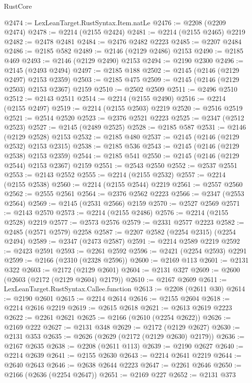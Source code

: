 \begin{lexlean}{RustCore}
\begin{coremodule}
@2474 := LexLeanTarget.RustSyntax.Item.natLe
@2476 := @2208 (@2209 @2474)
@2478 := @2214 (@2155 @2424)
@2481 := @2214 (@2155 @2465) @2219
@2482 := @2478 @2481
@2484 := @2476 @2482 @2223
@2485 := @2207 @2484
@2486 := @2185 @582
@2489 := @2146 (@2129 @2486) @2153
@2490 := @2185 @469
@2493 := @2146 (@2129 @2490) @2153
@2494 := @2190 @2300
@2496 := @2145 (@2493 @2494)
@2497 := @2185 @188
@2502 := @2145 (@2146 (@2129 @2497) @2153 @2359)
@2503 := @2185 @475
@2509 := @2145 (@2146 (@2129 @2503) @2153 @2367) @2159
@2510 := @2502 @2509
@2511 := @2496 @2510
@2512 := @2143 @2511
@2514 := @2214 (@2155 @2490)
@2516 := @2214 (@2155 @2497)
@2519 := @2214 (@2155 @2503) @2219
@2520 := @2516 @2519
@2521 := @2514 @2520
@2523 := @2376 @2521 @2223
@2525 := @2347 (@2512 @2523)
@2527 := @2145 (@2489 @2525)
@2528 := @2185 @587
@2531 := @2146 (@2129 @2528) @2153
@2532 := @2185 @480
@2537 := @2145 (@2146 (@2129 @2532) @2153 @2315)
@2538 := @2185 @536
@2543 := @2145 (@2146 (@2129 @2538) @2153 @2359)
@2544 := @2185 @541
@2550 := @2145 (@2146 (@2129 @2544) @2153 @2367) @2159
@2551 := @2543 @2550
@2552 := @2537 @2551
@2553 := @2143 @2552
@2555 := @2214 (@2155 @2532)
@2557 := @2214 (@2155 @2538)
@2560 := @2214 (@2155 @2544) @2219
@2561 := @2557 @2560
@2562 := @2555 @2561
@2564 := @2376 @2562 @2223
@2566 := @2347 (@2553 @2564)
@2569 := @2145 (@2531 @2566) @2159
@2570 := @2527 @2569
@2571 := @2143 @2570
@2573 := @2214 (@2155 @2486)
@2576 := @2214 (@2155 @2528) @2219
@2577 := @2573 @2576
@2579 := @2331 @2577 @2223
@2582 := @2485 (@2571 @2579) @2258
@2587 := @2207 @2582 (@2254 @2315) (@2254 @2494)
@2589 := @2347 (@2473 @2587)
@2591 := @2214 @2589 @2219
@2592 := @2423 @2591
@2593 := @2261 @2592
@2596 := @2421 (@2254 @2593) @2291
@2599 := @2166 (@2310 (@2328 @2596))
@2600 := @2169 @113
@2601 := @2131 @322
@2603 := @2172 (@2129 @2601)
@2604 := @2131 @327
@2609 := @2600 (@2603 (@2172 (@2129 @2604) @2179))
@2610 := @2167 @2609
@2611 := LexLeanTarget.RustSyntax.Callee.function
@2613 := @2208 (@2611 @30)
@2614 := @2190 @2601
@2615 := @2214 @2614
@2616 := @2155 @2604
@2618 := @2214 @2616 @2219
@2619 := @2615 @2618
@2621 := @2613 @2619 @2223
@2622 := @2261 @2621
@2625 := @2166 (@2610 (@2254 @2622))
@2626 := @2169 @222
@2627 := @2131 @348
@2629 := @2172 (@2129 @2627)
@2630 := @2131 @353
@2635 := @2626 (@2629 (@2172 (@2129 @2630) @2179))
@2636 := @2167 @2635
@2638 := @2208 (@2611 @113)
@2639 := @2190 @2627
@2640 := @2214 @2639
@2641 := @2155 @2630
@2643 := @2214 @2641 @2219
@2644 := @2640 @2643
@2646 := @2638 @2644 @2223
@2647 := @2261 @2646
@2650 := @2166 (@2636 (@2254 @2647))
@2651 := @2169 @227
@2652 := @2131 @373

\end{coremodule}
\end{lexlean}

